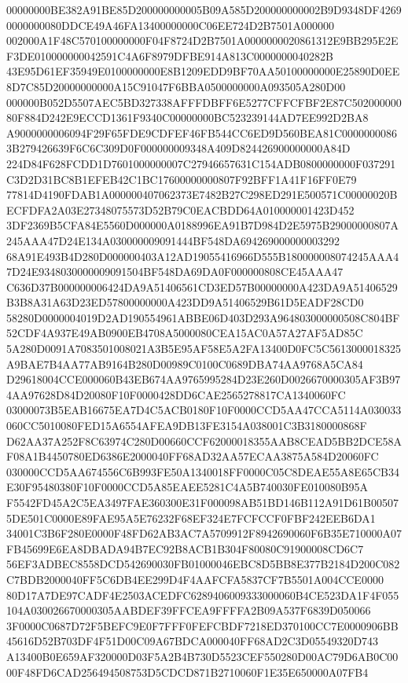 \documentclass[UTF8,fontset=fandol,zihao=-4,a4paper]{ctexart}
\begin{document}
{{00000000BE382A91BE85D200000000005B09A585D200000000002B9D9348DF42690000000080DDCE49A46FA13400000000C06EE724D2B7501A000000
002000A1F48C570100000000F04F8724D2B7501A0000000020861312E9BB295E2EF3DE010000000042591C4A6F8979DFBE914A813C0000000040282B
43E95D61EF35949E0100000000E8B1209EDD9BF70AA50100000000E25890D0EE8D7C85D20000000000A15C91047F6BBA0500000000A093505A280D00
000000B052D5507AEC5BD327338AFFFDBFF6E5277CFFCFBF2E87C50200000080F884D242E9ECCD1361F9340C00000000BC523239144AD7EE992D2BA8
A9000000006094F29F65FDE9CDFEF46FB544CC6ED9D560BEA81C00000000863B279426639F6C6C309D0F000000009348A409D824426900000000A84D
224D84F628FCDD1D7601000000007C27946657631C154ADB0800000000F037291C3D2D31BC8B1EFEB42C1BC17600000000807F92BFF1A41F16FF0E79
77814D4190FDAB1A000000407062373E7482B27C298ED291E500571C00000020BECFDFA2A03E27348075573D52B79C0EACBDD64A010000001423D452
3DF2369B5CFA84E5560D000000A0188996EA91B7D984D2E5975B29000000807A245AAA47D24E134A030000009091444BF548DA694269000000003292
68A91E493B4D280D000000403A12AD19055416966D555B180000008074245AAA47D24E9348030000009091504BF548DA69DA0F000000808CE45AAA47
C636D37B000000006424DA9A51406561CD3ED57B00000000A423DA9A51406529B3B8A31A63D23ED57800000000A423DD9A51406529B61D5EADF28CD0
58280D0000004019D2AD190554961ABBE06D403D293A964803000000508C804BF52CDF4A937E49AB0900EB4708A5000080CEA15AC0A57A27AF5AD85C
5A280D0091A7083501008021A3B5E95AF58E5A2FA13400D0FC5C5613000018325A9BAE7B4AA77AB9164B280D00989C0100C0689DBA74AA9768A5CA84
D29618004CCE000060B43EB674AA9765995284D23E260D0026670000305AF3B974AA97628D84D20080F10F0000428DD6CAE2565278817CA1340060FC
03000073B5EAB16675EA7D4C5ACB0180F10F0000CCD5AA47CCA5114A030033060CC5010080FED15A6554AFEA9DB13FE3154A038001C3B3180000868F
D62AA37A252F8C63974C280D00660CCF62000018355AAB8CEAD5BB2DCE58AF08A1B4450780ED6386E2000040FF68AD32AA57ECAA3875A584D20060FC
030000CCD5AA674556C6B993FE50A1340018FF0000C05C8DEAE55A8E65CB34E30F95480380F10F0000CCD5A85EAEE5281C4A5B740030FE010080B95A
F5542FD45A2C5EA3497FAE360300E31F000098AB51BD146B112A91D61B005075DE501C0000E89FAE95A5E76232F68EF324E7FCFCCF0FBF242EEB6DA1
34001C3B6F280E0000F48FD62AB3AC7A5709912F8942690060F6B35E710000A07FB45699E6EA8DBADA94B7EC92B8ACB1B304F80080C91900008CD6C7
56EF3ADBEC8558DCD542690030FB01000046EBC8D5BB8E377B2184D200C082C7BDB2000040FF5C6DB4EE299D4F4AAFCFA5837CF7B5501A004CCE0000
80D17A7DE97CADF4E2503ACEDFC6289406009333000060B4CE523DA1F4F055104A030026670000305AABDEF39FFCEA9FFFFA2B09A537F6839D050066
3F0000C0687D72F5BEFC9E0F7FFF0FEFCBDF7218ED370100CC7E0000906BB45616D52B703DF4F51D00C09A67BDCA000040FF68AD2C3D05549320D743
A13400B0E659AF320000D03F5A2B4B730D5523CEF550280D00AC79D6AB0C0000F48FD6CAD256494508753D5CDCD871B2710060F1E35E650000A07FB4
}}
\end{document}
